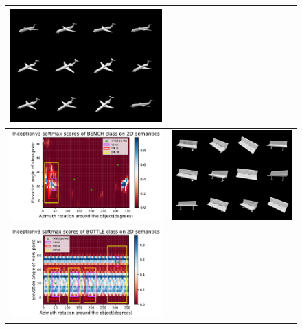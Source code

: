 \begin{figure}[h]
\begin{tabular}[!t]{c|c}
 \includegraphics[width = 7.5cm]{supimages/qualitative/aeroplane/aeroplane_s.png}\\ \hline 
\includegraphics[width = 9.5cm]{supimages/qualitative/Inceptionv3_bench_0_regions.pdf} & 
 \includegraphics[width = 7.5cm]{supimages/qualitative/bench/bench_s.png}\\ \hline 
\includegraphics[width = 9.5cm]{supimages/qualitative/Inceptionv3_bottle_2_regions.pdf}  &

\end{tabular}
\end{figure}
